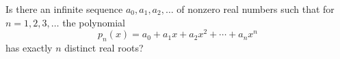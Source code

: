 Is there an infinite sequence $a_0, a_1, a_2, \dots$ of
nonzero real numbers such that for $n = 1, 2, 3, \dots$ the polynomial
\[
p_n(x) = a_0 + a_1x + a_2x^2 + \cdots + a_nx^n
\]
has exactly $n$ distinct real roots?
